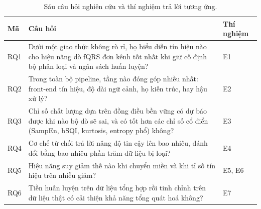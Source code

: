 \begin{table}[H]\centering\small
\caption{Sáu câu hỏi nghiên cứu và thí nghiệm trả lời tương ứng.}
\label{tab:rq}
\begin{tabular}{@{}C{1.1cm} L{10.6cm} L{2.5cm}@{}}
\toprule
\textbf{Mã} & \textbf{Câu hỏi} & \textbf{Thí nghiệm} \\
\midrule
RQ1 & Dưới một giao thức không rò rỉ, họ biểu diễn tín hiệu nào cho hiệu năng dò fQRS đơn kênh tốt nhất
khi giữ cố định bộ phân loại và ngân sách huấn luyện? & E1 \\
RQ2 & Trong toàn bộ pipeline, tầng nào đóng góp nhiều nhất: front-end tín hiệu, độ dài ngữ cảnh, họ
kiến trúc, hay hậu xử lý? & E2 \\
RQ3 & Chỉ số chất lượng dựa trên đồng điều bền vững có dự báo được khi nào bộ dò sẽ sai, và có tốt hơn
các chỉ số cổ điển (SampEn, bSQI, kurtosis, entropy phổ) không? & E3 \\
RQ4 & Cơ chế từ chối trả lời nâng độ tin cậy lên bao nhiêu, đánh đổi bằng bao nhiêu phần trăm dữ liệu
bị loại? & E4 \\
RQ5 & Hiệu năng suy giảm thế nào khi chuyển miền và khi tỉ số tín hiệu trên nhiễu giảm? & E5, E6 \\
RQ6 & Tiền huấn luyện trên dữ liệu tổng hợp rồi tinh chỉnh trên dữ liệu thật có cải thiện khả năng
tổng quát hoá không? & E7 \\
\bottomrule
\end{tabular}
\end{table}

